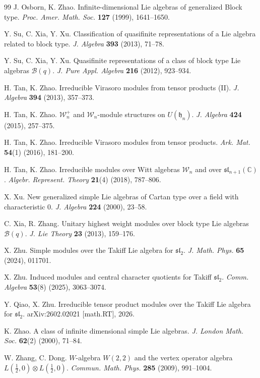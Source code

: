 \documentclass[a4paper]{amsart}
\numberwithin{equation}{section}
\begin{document}
\begin{thebibliography}{99}
J. Osborn, K. Zhao.
Infinite-dimensional Lie algebras of generalized Block type.
{\it Proc. Amer. Math. Soc.} {\bf 127} (1999), 1641--1650.

Y. Su, C. Xia, Y. Xu.
Classification of quasifinite representations of a Lie algebra related to block type.
{\it J. Algebra} {\bf 393} (2013), 71--78.

Y. Su, C. Xia, Y. Xu.
Quasifinite representations of a class of block type Lie algebras $\mathcal{B}(q)$.
{\it J. Pure Appl. Algebra} {\bf 216} (2012), 923--934.

H. Tan, K. Zhao.
Irreducible Virasoro modules from tensor products (II).
{\it J. Algebra} {\bf 394} (2013), 357--373.

H. Tan, K. Zhao.
$\mathcal W_n^+$ and $\mathcal W_n$-module structures on $U(\mathfrak h_n)$.
{\it J. Algebra} {\bf 424} (2015), 257--375.

H. Tan, K. Zhao.
Irreducible Virasoro modules from tensor products.
{\it Ark. Mat.} {\bf 54}(1) (2016), 181--200.

H. Tan, K. Zhao.
Irreducible modules over Witt algebras $\mathcal W_n$ and over $\mathfrak{sl}_{n+1}(\mathbb C)$.
{\it Algebr. Represent. Theory} {\bf 21}(4) (2018), 787--806.

X. Xu.
New generalized simple Lie algebras of Cartan type over a field with characteristic $0$.
{\it J. Algebra} {\bf 224} (2000), 23--58.

C. Xia, R. Zhang.
Unitary highest weight modules over block type Lie algebras $\mathcal{B}(q)$.
{\it J. Lie Theory} {\bf 23} (2013), 159--176.

X. Zhu.
Simple modules over the Takiff Lie algebra for $\mathfrak{sl}_2$.
{\it J. Math. Phys.} {\bf 65} (2024), 011701.

X. Zhu.
Induced modules and central character quotients for Takiff $\mathfrak{sl}_2$.
{\it Comm. Algebra} {\bf 53}(8) (2025), 3063--3074.

Y. Qiao, X. Zhu.
Irreducible tensor product modules over the Takiff Lie algebra for $\mathfrak{sl}_2$.
arXiv:2602.02021 [math.RT], 2026.

K. Zhao.
A class of infinite dimensional simple Lie algebras.
{\it J. London Math. Soc.} {\bf 62}(2) (2000), 71--84.

W. Zhang, C. Dong.
$W$-algebra $W(2,2)$ and the vertex operator algebra $L(\frac{1}{2},0)\otimes L(\frac{1}{2},0)$.
{\it Commun. Math. Phys.} {\bf 285} (2009), 991--1004.

\end{thebibliography}
\end{document}
